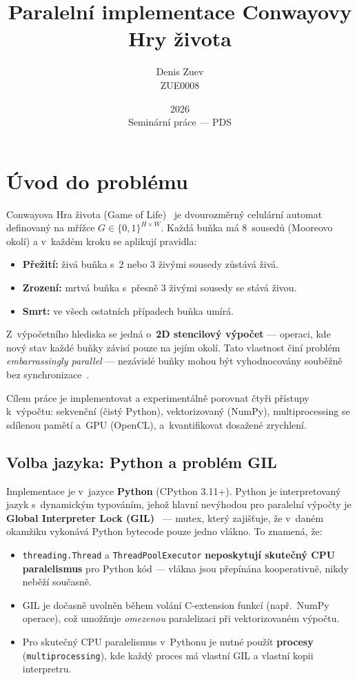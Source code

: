 \documentclass[12pt,a4paper]{article}
\title{\textbf{Paralelní implementace Conwayovy Hry života}}
\author{Denis Zuev \\ \small ZUE0008}
\date{2026 \\ \small Seminární práce --- PDS}
\begin{document}
\maketitle
\tableofcontents
\newpage

\section{Úvod do problému}

Conwayova Hra života (Game of Life)~\cite{gardner1970} je dvourozměrný celulární automat definovaný na mřížce $G \in \{0,1\}^{H \times W}$. Každá buňka má 8~sousedů (Mooreovo okolí) a v~každém kroku se aplikují pravidla:

\begin{itemize}
    \item \textbf{Přežití:} živá buňka s~2 nebo 3 živými sousedy zůstává živá.
    \item \textbf{Zrození:} mrtvá buňka s~přesně 3 živými sousedy se stává živou.
    \item \textbf{Smrt:} ve všech ostatních případech buňka umírá.
\end{itemize}

Z~výpočetního hlediska se jedná o~\textbf{2D stencilový výpočet} --- operaci, kde nový stav každé buňky závisí pouze na jejím okolí. Tato vlastnost činí problém \emph{embarrassingly parallel} --- nezávislé buňky mohou být vyhodnocovány souběžně bez synchronizace~\cite{mattson2004}.

Cílem práce je implementovat a experimentálně porovnat čtyři přístupy k~výpočtu: sekvenční (čistý Python), vektorizovaný (NumPy), multiprocessing se sdílenou pamětí a~GPU (OpenCL), a~kvantifikovat dosažené zrychlení.

\subsection{Volba jazyka: Python a problém GIL}

Implementace je v~jazyce \textbf{Python} (CPython 3.11+). Python je interpretovaný jazyk s~dynamickým typováním, jehož hlavní nevýhodou pro paralelní výpočty je \textbf{Global Interpreter Lock (GIL)}~\cite{beazley2010} --- mutex, který zajišťuje, že v~daném okamžiku vykonává Python bytecode pouze jedno vlákno. To znamená, že:

\begin{itemize}
    \item \texttt{threading.Thread} a \texttt{ThreadPoolExecutor} \textbf{neposkytují skutečný CPU paralelismus} pro Python kód --- vlákna jsou přepínána kooperativně, nikdy neběží současně.
    \item GIL je dočasně uvolněn během volání C-extension funkcí (např.\ NumPy operace), což umožňuje \emph{omezenou} paralelizaci při vektorizovaném výpočtu.
    \item Pro skutečný CPU paralelismus v~Pythonu je nutné použít \textbf{procesy} (\texttt{multiprocessing}), kde každý proces má vlastní GIL a vlastní kopii interpretru.
\end{itemize}
\end{document}
